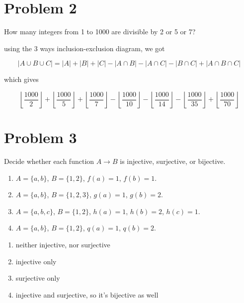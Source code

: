 \vspace{1em}
\hrulefill

\section*{Problem 2}
How many integers from 1 to 1000 are divisible by 2 or 5 or 7?

\medskip
\solution

using the 3 ways inclusion-exclusion diagram, we got 

\[|A \cup B \cup C| = |A| + |B| + |C| - |A \cap B| - |A \cap C| - |B \cap C| + |A \cap B \cap C| \]

which gives

\[ \left\lfloor \frac{1000}{2} \right\rfloor + \left\lfloor \frac{1000}{5} \right\rfloor + \left\lfloor \frac{1000}{7} \right\rfloor - \left\lfloor \frac{1000}{10} \right\rfloor - \left\lfloor \frac{1000}{14} \right\rfloor - \left\lfloor \frac{1000}{35} \right\rfloor + \left\lfloor \frac{1000}{70} \right\rfloor\]

\vspace{1em}
\hrulefill

\section*{Problem 3}
Decide whether each function $A \to B$ is injective, surjective, or bijective.
\begin{enumerate}[label=\arabic*.]
    \item $A = \{a,b\}$, $B = \{1,2\}$, $f(a)=1$, $f(b)=1$.
    \item $A = \{a,b\}$, $B = \{1,2,3\}$, $g(a)=1$, $g(b)=2$.
    \item $A = \{a,b,c\}$, $B = \{1,2\}$, $h(a)=1$, $h(b)=2$, $h(c)=1$.
    \item $A = \{a,b\}$, $B = \{1,2\}$, $q(a)=1$, $q(b)=2$.
\end{enumerate}

\medskip
\solution

\begin{enumerate}
    \item neither injective, nor surjective
    \item injective only
    \item surjective only
    \item injective and surjective, so it's bijective as well
\end{enumerate}

\vspace{1em}
\hrulefill

